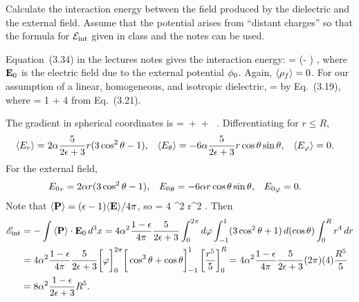 \newcommand{\evPr}{\ev{P_r}}
\newcommand{\evPth}{\ev{P_\tht}}
\newcommand{\evPph}{\ev{P_\vph}}
\newcommand{\dph}{\dd{\vph}}
\newcommand{\intRi}{\int_R^\infty}
\newcommand{\intoR}{\int_0^R}

\begin{problem}
	Calculate the interaction energy between the field produced by the dielectric and the external field.  Assume that the potential arises from ``distant charges'' so that the formula for $\mathcal{E}_\text{int}$ given in class and the notes can be used.
\end{problem}

\begin{solution}
	Equation~(3.34) in the lectures notes gives the interaction energy:
	\beq
		\sEint = \int (\evrhof \!\phio - \evP \cdot \vEo) \dcx,
	\eeq
	where $\vb{E}_0$ is the electric field due to the external potential $\phi_0$.  Again, $\evrhof = 0$.  For our assumption of a linear, homogeneous, and isotropic dielectric,
	\beqn \label{P}
		\evP = \chi \!\evE
	\eeqn
	by Eq.~(3.19), where
	\beq
		\eps = 1 + 4\pi \chi
	\eeq
	from Eq.~(3.21).
	
	The gradient in spherical coordinates is
	\beqn \label{grad}
		\grad =  \,\rh +  \pdv{}{\tht} \,\thh +  \pdv{}{\vph} \, \phh.
	\eeqn
	Differentiating  for $r \leq R$,
	\begin{align} \label{Ein}
		\evEr &= 2 \alp \frac{5}{2\eps + 3} r (3 \cos^2\tht - 1), &
		\evEth &= -6 \alp \frac{5}{2\eps + 3} r \cost \sint, &
		\evEph &= 0.
	\end{align}
	For the external field,
	\begin{align} \label{E0}
		{E_0}_r &= 2 \alpha r (3 \cos^2\theta - 1), &
		{E_0}_\theta &= -6 \alpha r \cos\theta \sin\theta, &
		{E_0}_\varphi &= 0.
	\end{align}
	Note that $\evP = (\eps - 1) \!\evE\! / 4 \pi$, so
	\beq
		\evP \cdot \vEo = 4 \alp^2   r^2 .
	\eeq
	Then
	\begin{align*}
		\sEint &= -\int \evP \cdot \vEo \dcx
		= 4 \alp^2 \frac{1 - \eps}{4\pi} \frac{5}{2\eps + 3} \intotp \dph \intono (3 \cos^2\tht + 1) \dct \intoR r^4 \dr \\
		&= 4 \alp^2 \frac{1 - \eps}{4\pi} \frac{5}{2\eps + 3} \bigg[ \vph \bigg]_0^{2\pi} \bigg[ \cos^3\tht + \cost \bigg]_{-1}^1 \left[ \frac{r^5}{5} \right]_0^R
		= 4 \alp^2 \frac{1 - \eps}{4\pi} \frac{5}{2\eps + 3} (2\pi) (4) \frac{R^5}{5} \\
		&= 8 \alp^2 \frac{1 - \eps}{2\eps + 3} R^5.
	\end{align*}
\end{solution}
\vfix



